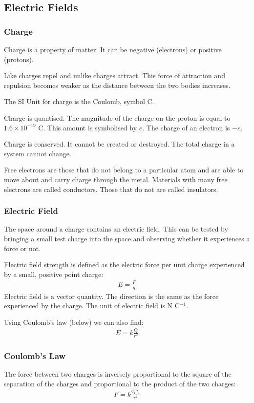 \subsection{Electric Fields}

\subsubsection{Charge}
Charge is a property of matter. It can be negative (electrons) or positive
(protons).

Like charges repel and unlike charges attract. This force of attraction and
repulsion becomes weaker as the distance between the two bodies increases.

The SI Unit for charge is the Coulomb, symbol C.

Charge is quantised. The magnitude of the charge on the proton is equal to
$1.6 \times 10^{-19}$ C. This amount is symbolised by $e$. The charge of an
electron is $-e$.

Charge is conserved. It cannot be created or destroyed. The total charge in a
system cannot change.

Free electrons are those that do not belong to a particular atom and are able
to move about and carry charge through the metal. Materials with many free
electrons are called conductors. Those that do not are called insulators.

\subsubsection{Electric Field}
The space around a charge contains an electric field. This can be tested by
bringing a small test charge into the space and observing whether it
experiences a force or not.

Electric field strength is defined as the electric force per unit charge
experienced by a small, positive point charge:
\begin{align*}
    E = \frac{F}{q}
\end{align*}
Electric field is a vector quantity. The direction is the same as the force
experienced by the charge. The unit of electric field is N C$^{-1}$.

Using Coulomb's law (below) we can also find:
\begin{align*}
    E = k \frac{Q}{r^2}
\end{align*}

\subsubsection{Coulomb's Law}
The force between two charges is inversely proportional to the square of the
separation of the charges and proportional to the product of the two charges:
\begin{align*}
    F = k \frac{q_1q_2}{r^2}
\end{align*}

